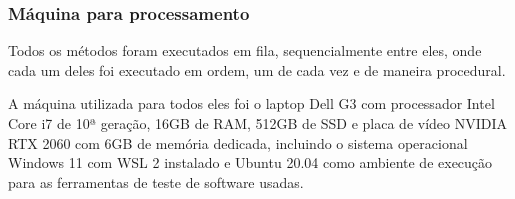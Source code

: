 \subsubsection{Máquina para processamento}

Todos os métodos foram executados em fila, sequencialmente entre eles, onde cada um deles foi executado em ordem, um de cada vez e de maneira procedural.

A máquina utilizada para todos eles foi o laptop Dell G3 com processador Intel Core i7 de 10ª geração, 16GB de RAM, 512GB de SSD e placa de vídeo NVIDIA RTX 2060 com 6GB de memória dedicada, incluindo o sistema operacional Windows 11 com WSL 2 instalado e Ubuntu 20.04 como ambiente de execução para as ferramentas de teste de software usadas.









